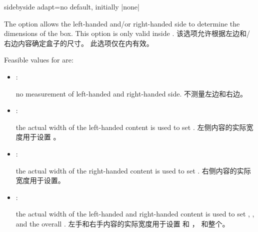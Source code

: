 \begin{docTcbKey}[][doc new=2015-11-20]{sidebyside adapt}{=}{no default, initially |none|}
\begin{stripedbox}
The option allows the left-handed and/or right-handed side to determine the dimensions of the box. 
This option is only valid inside .
\tcblower
该选项允许根据左边和/右边内容确定盒子的尺寸。
此选项仅在内有效。
\end{stripedbox}

Feasible values for  are:
\begin{itemize}
    \item{}: 
\begin{stripedbox}
no measurement of left-handed and right-handed side.
\tcblower
不测量左边和右边。
\end{stripedbox}
    \item{}:
\begin{stripedbox}
the actual width of the left-handed content is used to set .
\tcblower
左侧内容的实际宽度用于设置 。
\end{stripedbox}
    \item{}:
\begin{stripedbox}
the actual width of the right-handed content is used to set .
\tcblower
右侧内容的实际宽度用于设置。
\end{stripedbox}

    \item{}:
\begin{stripedbox}
the actual width of the left-handed and right-handed content is used to set ,  , and the overall .
\tcblower
左手和右手内容的实际宽度用于设置  和 ，%
和整个。
\end{stripedbox}

\end{itemize}

\begin{dispExample}
\end{dispExample}




\end{docTcbKey}

